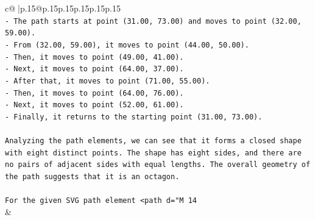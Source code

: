 \documentclass{article}
\begin{document}
{\begin{supertabular}{c@{$\;$}|p{.15\linewidth}@{}p{.15\linewidth}p{.15\linewidth}p{.15\linewidth}p{.15\linewidth}p{.15\linewidth}}
{{{\\ 
\texttt{{-} The path starts at point (31.00, 73.00) and moves to point (32.00, 59.00).} \\
\texttt{{-} From (32.00, 59.00), it moves to point (44.00, 50.00).} \\
\texttt{{-} Then, it moves to point (49.00, 41.00).} \\
\texttt{{-} Next, it moves to point (64.00, 37.00).} \\
\texttt{{-} After that, it moves to point (71.00, 55.00).} \\
\texttt{{-} Then, it moves to point (64.00, 76.00).} \\
\texttt{{-} Next, it moves to point (52.00, 61.00).} \\
\texttt{{-} Finally, it returns to the starting point (31.00, 73.00).} \\
\\ 
\texttt{Analyzing the path elements, we can see that it forms a closed shape with eight distinct points. The shape has eight sides, and there are no pairs of adjacent sides with equal lengths. The overall geometry of the path suggests that it is an octagon.} \\
\\ 
\texttt{For the given SVG path element <path d="M 14} \\
            }
        }
    }
    & \\ \\

\end{supertabular}
}
\end{document}
